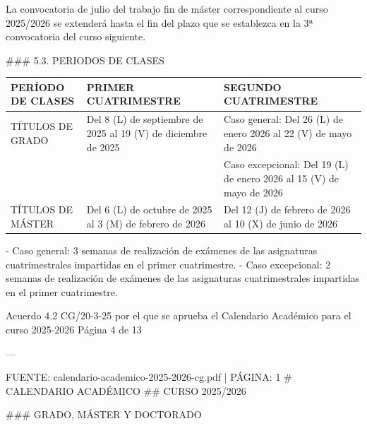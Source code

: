 \documentclass{article}
\begin{document}
\begin{itemize}
\begin{itemize}
\begin{scriptsize}
                  La convocatoria de julio del trabajo fin de máster correspondiente al curso 2025/2026 se extenderá hasta el fin del plazo que se establezca en la 3ª convocatoria del curso siguiente.

                  \#\#\# 5.3. PERIODOS DE CLASES

                  \vspace{0.4cm}
                  \begin{table}[h!]\centering\renewcommand{\arraystretch}{1.3}
                    \begin{tabular}{|p{}|p{}|p{}|}\hline
                      PERÍODO DE CLASES & PRIMER CUATRIMESTRE                                            & SEGUNDO CUATRIMESTRE                                                 \\\hline
                      TÍTULOS DE GRADO  & Del 8 (L) de septiembre de 2025 al 19 (V) de diciembre de 2025 & Caso general: Del 26 (L) de enero 2026 al 22 (V) de mayo de 2026     \\\hline
                                        &                                                                & Caso excepcional: Del 19 (L) de enero 2026 al 15 (V) de mayo de 2026 \\\hline
                      TÍTULOS DE MÁSTER & Del 6 (L) de octubre de 2025 al 3 (M) de febrero de 2026       & Del 12 (J) de febrero de 2026 al 10 (X) de junio de 2026             \\\hline
                    \end{tabular}\end{table}
                  \vspace{0.4cm}

                  - Caso general: 3 semanas de realización de exámenes de las asignaturas cuatrimestrales impartidas en el primer cuatrimestre.
                  - Caso excepcional: 2 semanas de realización de exámenes de las asignaturas cuatrimestrales impartidas en el primer cuatrimestre.

                  Acuerdo 4.2 CG/20-3-25 por el que se aprueba el Calendario Académico para el curso 2025-2026  Página 4 de 13

                  ---

                  FUENTE: calendario-academico-2025-2026-cg.pdf | PÁGINA: 1
                  \# CALENDARIO ACADÉMICO
                  \#\# CURSO 2025/2026

                  \#\#\# GRADO, MÁSTER Y DOCTORADO


\end{scriptsize}
\end{itemize}
\end{itemize}
\end{document}
